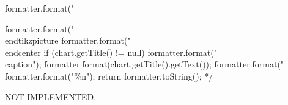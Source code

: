 \begin{code}
\begin{hide}
{      formatter.format("%

      formatter.format("\\end{tikzpicture}%
      formatter.format("\\end{center}%
      if (chart.getTitle() != null) {
         formatter.format("\\caption{");
         formatter.format(chart.getTitle().getText());
         formatter.format("}%
      }
      formatter.format("\%n");
      return formatter.toString();
*/
   }\end{hide}
\end{code}
\begin{tabb}
NOT IMPLEMENTED.
\end{tabb}
\begin{htmlonly}
\end{htmlonly}
\begin{code}
\begin{hide}
}\end{hide}
\end{code}
